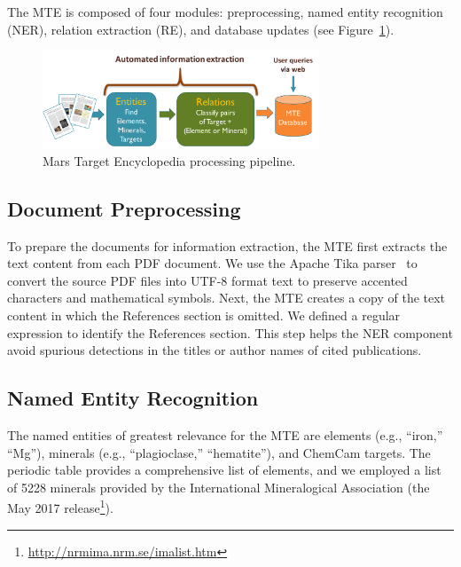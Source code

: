 \documentclass[letterpaper]{article} %
\begin{document}
The MTE is composed of four modules: preprocessing, named entity
recognition (NER), relation extraction (RE), and database updates (see
Figure~\ref{fig:mte}).

\begin{figure}
\begin{center}
\includegraphics[width=3.25in]{fig/system.pdf}
\end{center}
\caption{Mars Target Encyclopedia processing pipeline.}
\label{fig:mte}
\end{figure}

\subsection{Document Preprocessing}

To prepare the documents for information extraction, the MTE first
extracts the text content from each PDF document.  We use the Apache
Tika parser~\cite{mattmann:tika11} to convert the source PDF files
into UTF-8 format text to preserve accented characters and
mathematical symbols.
Next, the MTE creates a copy of the text content in which the
References section is omitted.  We defined a regular expression to
identify the References section.
This step helps the NER component avoid spurious detections in the
titles or author names of cited publications.

\subsection{Named Entity Recognition}

The named entities of greatest relevance for the MTE are elements
(e.g., ``iron,'' ``Mg''), minerals (e.g., ``plagioclase,''
``hematite''), and ChemCam targets.  The periodic table provides a
comprehensive list of elements, and we employed a list of 5228
minerals provided by the International Mineralogical Association (the
May 2017 release\footnote{\url{http://nrmima.nrm.se/imalist.htm}}). 
\end{document}

